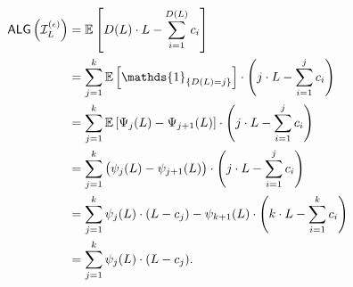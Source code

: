 \begin{align*}
\ALG\left(\mathcal{I}^{(\epsilon)}_{L}\right) &= \mathbb{E} \left[D(L) \cdot L - \sum_{i=1}^{D(L)} c_i \right] \\
& = \sum_{j=1}^{k} \mathbb{E} \left[ \mathds{1}_{\{D(L) = j\}} \right] \cdot \left(j \cdot L - \sum_{i=1}^{j} c_i \right) \\
& = \sum_{j=1}^{k} \mathbb{E} \left[\Psi_{j}(L) - \Psi_{j+1}(L) \right] \cdot \left(j \cdot L - \sum_{i=1}^{j} c_i \right)\\
& =  \sum_{j=1}^{k} \big(\psi_{j}(L) - \psi_{j+1}(L)\big) \cdot \left(j \cdot L - \sum_{i=1}^{j} c_i \right)\\
& = \sum_{j=1}^{k} \psi_{j}(L) \cdot (L - c_{j}) - \psi_{k+1}(L) \cdot \left(k\cdot L - \sum_{i=1}^{k} c_{i} \right)\\
& = \sum_{j=1}^{k} \psi_{j}(L) \cdot (L - c_{j}).
\end{align*}

